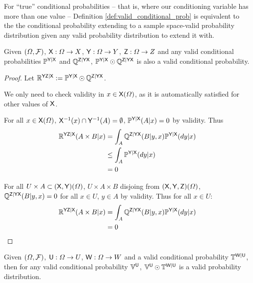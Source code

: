 For ``true'' conditional probabilities -- that is, where our conditioning variable has more than one value -- Definition \ref{def:valid_conditional_prob} is equivalent to the the conditional probability extending to a sample space-valid probability distribution given any valid probability distribution to extend it with.

\begin{lemma}\label{lem:valid_extendability}
Given $(\Omega,\mathcal{F})$, $\mathsf{X}:\Omega\to X$, $\mathsf{Y}:\Omega\to Y$, $\mathsf{Z}:\Omega\to Z$ and any valid conditional probabilities $\mathbb{P}^{\mathsf{Y}|\mathsf{X}}$ and $\mathbb{Q}^{\mathsf{Z}|\mathsf{Y}\mathsf{X}}$, $ \mathbb{P}^{\mathsf{Y}|\mathsf{X}}\odot \mathbb{Q}^{\mathsf{Z}|\mathsf{Y}\mathsf{X}}$ is also a valid conditional probability.
\end{lemma}

\begin{proof}
Let $\mathbb{R}^{\mathsf{YZ}|\mathsf{X}}:=\mathbb{P}^{\mathsf{Y}|\mathsf{X}}\odot \mathbb{Q}^{\mathsf{Z}|\mathsf{Y}\mathsf{X}}$.

We only need to check validity in $x\in \mathsf{X}(\Omega)$, as it is automatically satisfied for other values of $\mathsf{X}$.

For all $x\in \mathsf{X}(\Omega)$, $\mathsf{X}^{-1}(x)\cap\mathsf{Y}^{-1}(A)=\emptyset$, $\mathbb{P}^{\mathsf{Y}|\mathsf{X}}(A|x)=0$ by validity. Thus
\begin{align}
	\mathbb{R}^{\mathsf{YZ}|\mathsf{X}}(A\times B|x) &= \int_A\mathbb{Q}^{\mathsf{Z}|\mathsf{YX}}(B|y,x)\mathbb{P}^{\mathsf{Y}|\mathsf{X}}(dy|x)\\
								  &\leq \int_A\mathbb{P}^{\mathsf{Y}|\mathsf{X}}(dy|x)\\
								  &=0
\end{align}

For all $U\times A\subset (\mathsf{X},\mathsf{Y})(\Omega)$, $U\times A\times B$ disjoing from $(\mathsf{X},\mathsf{Y},\mathsf{Z})(\Omega)$, $\mathbb{Q}^{\mathsf{Z}|\mathsf{YX}}(B|y,x)=0$ for all $x\in U$, $y\in A$ by validity. Thus for all $x\in U$:
\begin{align}
	\mathbb{R}^{\mathsf{YZ}|\mathsf{X}}(A\times B|x) &= \int_A\mathbb{Q}^{\mathsf{Z}|\mathsf{YX}}(B|y,x)\mathbb{P}^{\mathsf{Y}|\mathsf{X}}(dy|x)\\
								  &=0
\end{align}
\end{proof}

\begin{corollary}
Given $(\Omega,\mathcal{F})$, $\mathsf{U}:\Omega\to U$, $\mathsf{W}:\Omega\to W$ and a valid conditional probability $\mathbb{T}^{\mathsf{W}|\mathsf{U}}$, then for any valid conditional probability $\mathbb{V}^{\mathsf{U}}$, $\mathbb{V}^{\mathsf{U}}\odot \mathbb{T}^{\mathsf{W}|\mathsf{U}}$ is a valid probability distribution.
\end{corollary}

